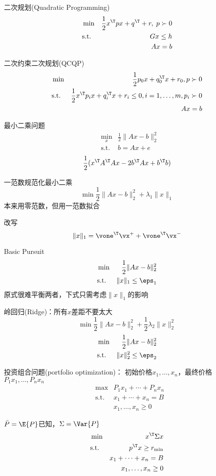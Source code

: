 二次规划(Quadratic Programming)
\[\begin{aligned}
	& \min & \frac{1}{2}x^\T px+q^\T+r,\;p\succ 0\\
	& \text{s.t.} & Gx\leq h\\
	& & Ax=b
\end{aligned}\]

二次约束二次规划(QCQP)
\[\begin{aligned}
	& \min & \frac{1}{2}p_0x+q_0^\T x+r_0,p\succ 0\\
	& \text{s.t.} & \frac{1}{2}x^\T p_ix+q_i^\T x+r_i\leq 0,i=1,\ldots,m,p_i\succ 0\\
	& & Ax=b
\end{aligned}\]

最小二乘问题
\[\begin{aligned}
	& \min_x & \frac{1}{2}\|Ax-b\|_2^2\\
	& \text{s.t.} & b=Ax+e
\end{aligned}\]
\[\frac{1}{2}(x^\T A^\T Ax-2b^\T Ax+b^\T b)\]

一范数规范化最小二乘
\[\min\frac{1}{2}\|Ax-b\|_2^2+\lambda_1\|x\|_1\]
本来用零范数，但用一范数拟合

改写
\[\|x\|_1=\vone^\T\vx^++\vone^\T\vx^-\]

Basic Pursuit
\[\begin{aligned}
	& \min & \frac{1}{2}\|Ax-b\|_2^2\\
	& \text{s.t.} & \|x\|_1\leq\eps_1
\end{aligned}\]
原式很难平衡两者，下式只需考虑$\|x\|_1$的影响

岭回归(Ridge)：所有$x$差距不要太大
\[\min\frac{1}{2}\|Ax-b\|_2^2+\frac{1}{2}\lambda_2\|x\|_2^2\]
\[\begin{aligned}
	& \min & \frac{1}{2}\|Ax-b\|_2^2\\
	& \text{s.t.} & \|x\|_2^2\leq\eps_2
\end{aligned}\]

投资组合问题(portfolio optimization)：
初始价格$x_1,\ldots,x_n$，最终价格$P_1x_1,\ldots,P_nx_n$
\[\begin{aligned}
	& \max & P_1x_1+\cdots+P_nx_n\\
	& \text{s.t.} & x_1+\cdots+x_n=B\\
	& & x_1,\ldots,x_n\geq 0
\end{aligned}\]

$\bar{P}=\E{P}$已知，$\Sigma=\Var{P}$
\[\begin{aligned}
	& \min & x^\T\Sigma x\\
	& \text{s.t.} & p^\T x\geq r_{\min}\\
	& & x_1+\cdots+x_n=B\\
	& & x_1,\ldots,x_n\geq 0
\end{aligned}\]